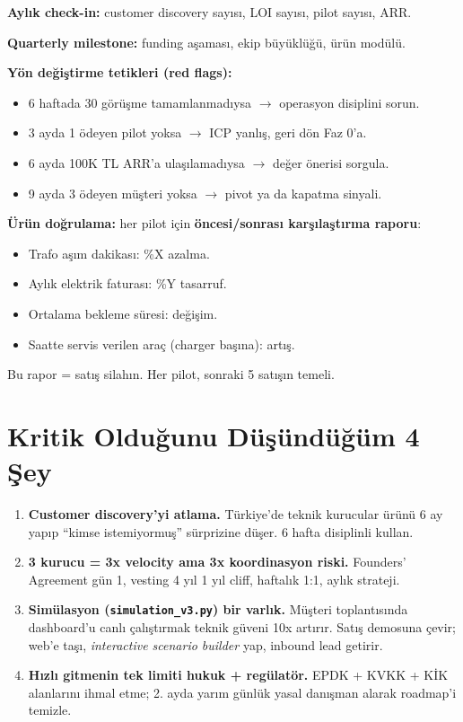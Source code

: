 \documentclass[11pt,a4paper]{article}
\begin{document}
\textbf{Aylık check-in:} customer discovery sayısı, LOI sayısı, pilot sayısı, ARR.

\textbf{Quarterly milestone:} funding aşaması, ekip büyüklüğü, ürün modülü.

\textbf{Yön değiştirme tetikleri (red flags):}
\begin{itemize}
    \item 6 haftada 30 görüşme tamamlanmadıysa $\rightarrow$ operasyon disiplini sorun.
    \item 3 ayda 1 ödeyen pilot yoksa $\rightarrow$ ICP yanlış, geri dön Faz 0'a.
    \item 6 ayda 100K TL ARR'a ulaşılamadıysa $\rightarrow$ değer önerisi sorgula.
    \item 9 ayda 3 ödeyen müşteri yoksa $\rightarrow$ pivot ya da kapatma sinyali.
\end{itemize}

\textbf{Ürün doğrulama:} her pilot için \textbf{öncesi/sonrası karşılaştırma raporu}:
\begin{itemize}
    \item Trafo aşım dakikası: \%X azalma.
    \item Aylık elektrik faturası: \%Y tasarruf.
    \item Ortalama bekleme süresi: değişim.
    \item Saatte servis verilen araç (charger başına): artış.
\end{itemize}

Bu rapor = satış silahın. Her pilot, sonraki 5 satışın temeli.

\section{Kritik Olduğunu Düşündüğüm 4 Şey}

\begin{enumerate}
    \item \textbf{Customer discovery'yi atlama.} Türkiye'de teknik kurucular ürünü 6 ay yapıp ``kimse istemiyormuş'' sürprizine düşer. 6 hafta disiplinli kullan.
    \item \textbf{3 kurucu = 3x velocity ama 3x koordinasyon riski.} Founders' Agreement gün 1, vesting 4 yıl 1 yıl cliff, haftalık 1:1, aylık strateji.
    \item \textbf{Simülasyon (\texttt{simulation\_v3.py}) bir varlık.} Müşteri toplantısında dashboard'u canlı çalıştırmak teknik güveni 10x artırır. Satış demosuna çevir; web'e taşı, \textit{interactive scenario builder} yap, inbound lead getirir.
    \item \textbf{Hızlı gitmenin tek limiti hukuk + regülatör.} EPDK + KVKK + KİK alanlarını ihmal etme; 2. ayda yarım günlük yasal danışman alarak roadmap'i temizle.
\end{enumerate}
\end{document}
